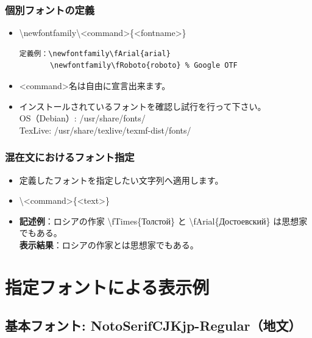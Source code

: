 \documentclass[a4paper,10pt]{ltjsarticle}
\def\colH#1{\color[HTML]{#1}}
\begin{document}
\subsubsection{個別フォントの定義}
\begin{itemize}
  \item[] {\colH{800000} \textbackslash newfontfamily\textbackslash<command>\{<fontname>\}}
\vspace{-2mm}
\begin{verbatim}
定義例：\newfontfamily\fArial{arial}
       \newfontfamily\fRoboto{roboto} % Google OTF
\end{verbatim} 
\vspace{-2mm}
  \item <command>名は自由に宣言出来ます。  
  \item インストールされているフォントを確認し試行を行って下さい。\\
OS（Debian）: /usr/share/fonts/\\
TexLive: /usr/share/texlive/texmf-dist/fonts/\vspace{-4mm}
\end{itemize}

\subsubsection{混在文におけるフォント指定}
\begin{itemize}
  \item 定義したフォントを指定したい文字列へ適用します。
  \item[] {\colH{800000} \textbackslash <command>\{<text>\}}
  \item[] \textbf{記述例}：ロシアの作家 {\colH{800000}\textbackslash fTimes\{}Толстой{\colH{800000}\}} と {\colH{800000}\textbackslash fArial\{}Достоевский{\colH{800000}\}} は思想家でもある。\vspace{2mm}\\
    \textbf{表示結果}：ロシアの作家とは思想家でもある。
\end{itemize}

\section{指定フォントによる表示例}
\subsection{基本フォント: \textcolor{rred}{NotoSerifCJKjp-Regular}（地文）}
\end{document}
